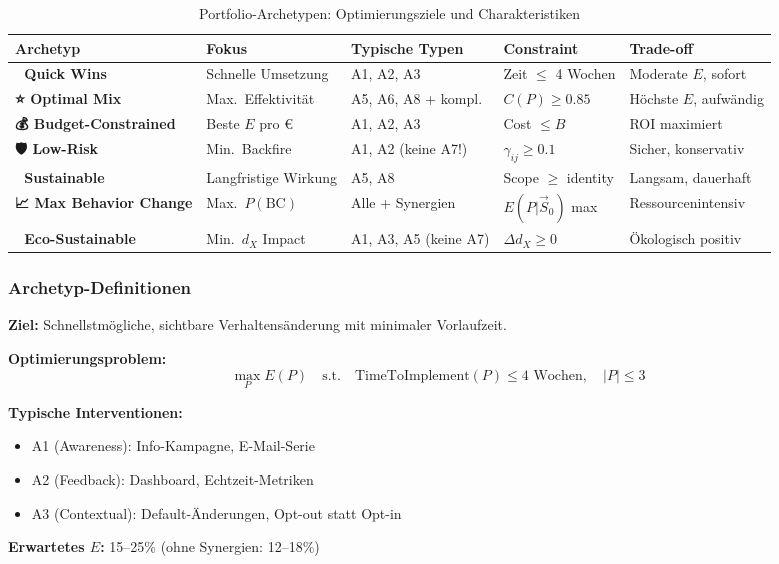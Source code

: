 \begin{table}[htbp]
\centering
\caption{Portfolio-Archetypen: Optimierungsziele und Charakteristiken}
\label{tab:20-archetypes}
\renewcommand{\arraystretch}{1.4}
\footnotesize
\begin{tabular}{@{}llp{3.8cm}ll@{}}
\toprule
\textbf{Archetyp} & \textbf{Fokus} & \textbf{Typische Typen} & \textbf{Constraint} & \textbf{Trade-off} \\
\midrule
\textbf{🚀 Quick Wins} & Schnelle Umsetzung & A1, A2, A3 & Zeit $\leq$ 4 Wochen & Moderate $E$, sofort \\
\textbf{⭐ Optimal Mix} & Max.\ Effektivität & A5, A6, A8 + kompl. & $C(P) \geq 0.85$ & Höchste $E$, aufwändig \\
\textbf{💰 Budget-Constrained} & Beste $E$ pro € & A1, A2, A3 & Cost $\leq B$ & ROI maximiert \\
\textbf{🛡️ Low-Risk} & Min.\ Backfire & A1, A2 (keine A7!) & $\gamma_{ij} \geq 0.1$ & Sicher, konservativ \\
\textbf{🔄 Sustainable} & Langfristige Wirkung & A5, A8 & Scope $\geq$ identity & Langsam, dauerhaft \\
\textbf{📈 Max Behavior Change} & Max.\ $P(\text{BC})$ & Alle + Synergien & $E(P|\vec{S}_0)$ max & Ressourcenintensiv \\
\textbf{🌱 Eco-Sustainable} & Min.\ $d_X$ Impact & A1, A3, A5 (keine A7) & $\Delta d_X \geq 0$ & Ökologisch positiv \\
\bottomrule
\end{tabular}
\end{table}

\subsubsection{Archetyp-Definitionen}

\begin{tcolorbox}[colback=blue!5!white, colframe=blue!75!black,
    title=\textbf{Archetyp 1: 🚀 Quick Wins Portfolio}]
\textbf{Ziel:} Schnellstmögliche, sichtbare Verhaltensänderung mit minimaler Vorlaufzeit.

\textbf{Optimierungsproblem:}
\begin{equation}
\max_{P} E(P) \quad \text{s.t.} \quad \text{TimeToImplement}(P) \leq 4 \text{ Wochen}, \quad |P| \leq 3
\end{equation}

\textbf{Typische Interventionen:}
\begin{itemize}[nosep]
\item A1 (Awareness): Info-Kampagne, E-Mail-Serie
\item A2 (Feedback): Dashboard, Echtzeit-Metriken
\item A3 (Contextual): Default-Änderungen, Opt-out statt Opt-in
\end{itemize}

\textbf{Erwartetes $E$:} 15--25\% (ohne Synergien: 12--18\%)
\end{tcolorbox}

